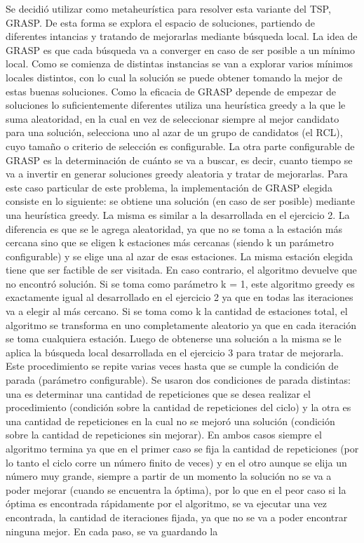         Se decidió utilizar como metaheurística para resolver esta variante del TSP, GRASP. De esta forma se explora el espacio de soluciones, partiendo de diferentes intancias y tratando de mejorarlas mediante búsqueda local. La idea de GRASP es que cada búsqueda va a converger en caso de ser posible a un mínimo local. Como se comienza de distintas instancias se van a explorar varios mínimos locales distintos, con lo cual la solución se puede obtener tomando la mejor de estas buenas soluciones. Como la eficacia de GRASP depende de empezar de soluciones lo suficientemente diferentes utiliza una heurística greedy a la que le suma aleatoridad, en la cual en vez de seleccionar siempre al mejor candidato para una solución, selecciona uno al azar de un grupo de candidatos (el RCL), cuyo tamaño o criterio de selección es configurable. La otra parte configurable de GRASP es la determinación de cuánto se va a buscar, es decir, cuanto tiempo se va a invertir en generar soluciones greedy aleatoria y tratar de mejorarlas. Para este caso particular de este problema, la implementación de GRASP elegida consiste en lo siguiente: se obtiene una solución (en caso de ser posible) mediante una heurística greedy. La misma es similar a la desarrollada en el ejercicio 2. La diferencia es que se le agrega aleatoridad, ya que no se toma a la estación más cercana sino que se eligen k estaciones más cercanas (siendo k un parámetro configurable) y se elige una al azar de esas estaciones. La misma estación elegida tiene que ser factible de ser visitada. En caso contrario, el algoritmo devuelve que no encontró solución. Si se toma como parámetro k = 1, este algoritmo greedy es exactamente igual al desarrollado en el ejercicio 2 ya que en todas las iteraciones va a elegir al más cercano. Si se toma como k la cantidad de estaciones total, el algoritmo se transforma en uno completamente aleatorio ya que en cada iteración se toma cualquiera estación. Luego de obtenerse una solución a la misma se le aplica la búsqueda local desarrollada en el ejercicio 3 para tratar de mejorarla. Este procedimiento se repite varias veces hasta que se cumple la condición de parada (parámetro configurable). Se usaron dos condiciones de parada distintas: una es determinar una cantidad de repeticiones que se desea realizar el procedimiento (condición sobre la cantidad de repeticiones del ciclo) y la otra es una cantidad de repeticiones en la cual no se mejoró una solución (condición sobre la cantidad de repeticiones sin mejorar). En ambos casos siempre el algoritmo termina ya que en el primer caso se fija la cantidad de repeticiones (por lo tanto el ciclo corre un número finito de veces) y en el otro aunque se elija un número muy grande, siempre a partir de un momento la solución no se va a poder mejorar (cuando se encuentra la óptima), por lo que en el peor caso si la óptima es encontrada rápidamente por el algoritmo, se va ejecutar una vez encontrada, la cantidad de iteraciones fijada, ya que no se va a poder encontrar ninguna mejor. En cada paso, se va guardando la 